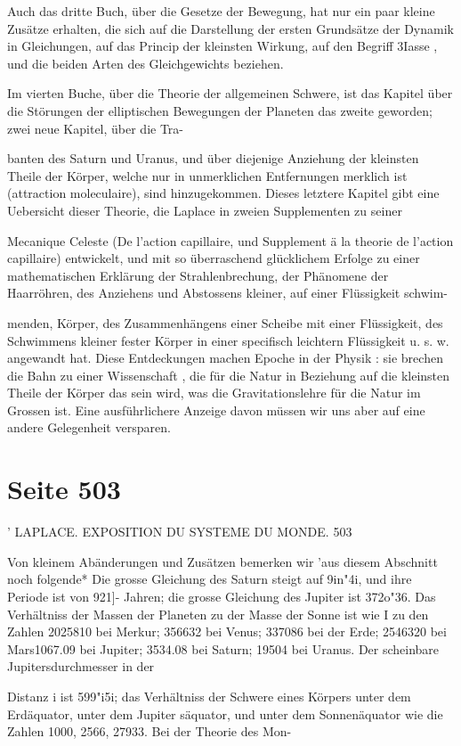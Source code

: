 \documentclass[10pt,a4paper]{article}
\begin{document}
Auch das dritte Buch, über die Gesetze der Bewegung, hat nur ein paar kleine Zusätze erhalten, die sich auf die Darstellung der ersten Grundsätze der Dynamik in Gleichungen, auf das Princip der kleinsten Wirkung, auf den Begriff 3Iasse , und die beiden Arten des Gleichgewichts beziehen.

Im vierten Buche, über die Theorie der allgemeinen Schwere, ist das Kapitel über die Störungen der elliptischen Bewegungen der Planeten das zweite geworden; zwei neue Kapitel, über die Tra-

banten des Saturn und Uranus, und über diejenige Anziehung der kleinsten Theile der Körper, welche nur in unmerklichen Entfernungen merklich ist (attraction moleculaire), sind hinzugekommen. Dieses letztere Kapitel gibt eine Uebersicht dieser Theorie, die Laplace in zweien Supplementen zu seiner

Mecanique Celeste (De l'action capillaire, und Supplement ä la theorie de l'action capillaire) entwickelt, und mit so überraschend glücklichem Erfolge zu einer mathematischen Erklärung der Strahlenbrechung, der Phänomene der Haarröhren, des Anziehens und Abstossens kleiner, auf einer Flüssigkeit schwim-

menden, Körper, des Zusammenhängens einer Scheibe mit einer Flüssigkeit, des Schwimmens kleiner fester Körper in einer specifisch leichtern Flüssigkeit u. s. w. angewandt hat. Diese Entdeckungen machen Epoche in der Physik : sie brechen die Bahn zu einer Wissenschaft , die für die Natur in Beziehung auf die kleinsten Theile der Körper das sein wird, was die Gravitationslehre für die Natur im Grossen ist. Eine ausführlichere Anzeige davon müssen wir uns aber auf eine andere Gelegenheit versparen.


\newpage
\section*{Seite 503}
' LAPLACE. EXPOSITION DU SYSTEME DU MONDE. 503

Von kleinem Abänderungen und Zusätzen bemerken wir 'aus diesem Abschnitt noch folgende* Die grosse Gleichung des Saturn steigt auf 9in"4i, und ihre Periode ist von 921]- Jahren; die grosse Gleichung des Jupiter ist 372o"36. Das Verhältniss der Massen der Planeten zu der Masse der Sonne ist wie I zu den Zahlen 2025810 bei Merkur; 356632 bei Venus; 337086 bei der Erde; 2546320 bei Mars1067.09 bei Jupiter; 3534.08 bei Saturn; 19504 bei Uranus. Der scheinbare Jupitersdurchmesser in der

Distanz i ist 599"i5i; das Verhältniss der Schwere eines Körpers unter dem Erdäquator, unter dem Jupiter säquator, und unter dem Sonnenäquator wie die Zahlen 1000, 2566, 27933. Bei der Theorie des Mon-
\end{document}
